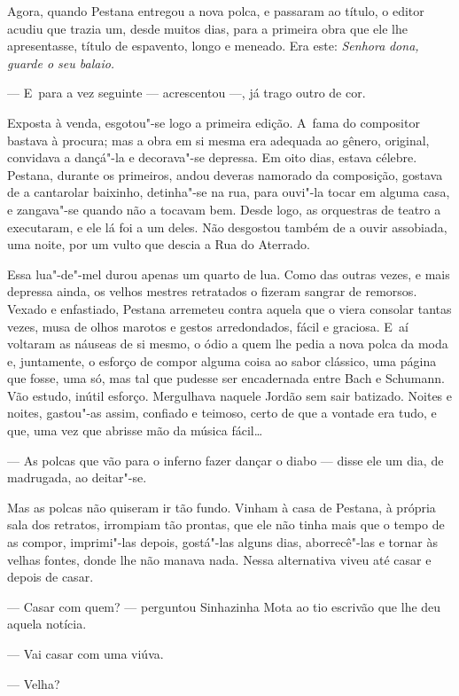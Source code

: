 \begin{linenumbers}
Agora, quando Pestana entregou a nova polca, e passaram ao título, o
editor acudiu que trazia um, desde muitos dias, para a primeira obra que
ele lhe apresentasse, título de espavento, longo e meneado. Era este:
\emph{Senhora} \emph{dona, guarde o seu balaio.}

--- E~para a vez seguinte --- acrescentou ---, já trago outro de cor.

Exposta à venda, esgotou"-se logo a primeira edição. A~fama do compositor
bastava à procura; mas a obra em si mesma era adequada ao gênero,
original, convidava a dançá"-la e decorava"-se depressa. Em oito dias,
estava célebre. Pestana, durante os primeiros, andou deveras namorado da
composição, gostava de a cantarolar baixinho, detinha"-se na rua, para
ouvi"-la tocar em alguma casa, e zangava"-se quando não a tocavam bem.
Desde logo, as orquestras de teatro a executaram, e ele lá foi a um
deles. Não desgostou também de a ouvir assobiada, uma noite, por um
vulto que descia a Rua do Aterrado.

Essa lua"-de"-mel durou apenas um quarto de lua. Como das outras vezes, e
mais depressa ainda, os velhos mestres retratados o fizeram sangrar de
remorsos. Vexado e enfastiado, Pestana arremeteu contra aquela que o
viera consolar tantas vezes, musa de olhos marotos e gestos
arredondados, fácil e graciosa. E~aí voltaram as náuseas de si mesmo, o
ódio a quem lhe pedia a nova polca da moda e, juntamente, o esforço de
compor alguma coisa ao sabor clássico, uma página que fosse, uma só, mas
tal que pudesse ser encadernada entre Bach e Schumann. Vão estudo,
inútil esforço. Mergulhava naquele Jordão sem sair batizado. Noites e
noites, gastou"-as assim, confiado e teimoso, certo de que a vontade era
tudo, e que, uma vez que abrisse mão da música fácil\ldots{}

--- As polcas que vão para o inferno fazer dançar o diabo --- disse ele um
dia, de madrugada, ao deitar"-se.

Mas as polcas não quiseram ir tão fundo. Vinham à casa de Pestana, à
própria sala dos retratos, irrompiam tão prontas, que ele não tinha mais
que o tempo de as compor, imprimi"-las depois, gostá"-las alguns dias,
aborrecê"-las e tornar às velhas fontes, donde lhe não manava nada. Nessa
alternativa viveu até casar e depois de casar.

--- Casar com quem? --- perguntou Sinhazinha Mota ao tio escrivão que lhe
deu aquela notícia.

--- Vai casar com uma viúva.

--- Velha?


\end{linenumbers}
